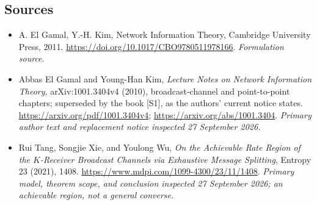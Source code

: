 \documentclass[11pt]{article}
\begin{document}
\subsection{Sources}
\begin{itemize}
\item[S1]A. El Gamal, Y.-H. Kim, Network Information Theory, Cambridge University Press, 2011.
\url{https://doi.org/10.1017/CBO9780511978166}.
\textit{Formulation source.}
\item[E1]Abbas El Gamal and Young-Han Kim,
\emph{Lecture Notes on Network Information Theory},
arXiv:1001.3404v4 (2010), broadcast-channel and point-to-point chapters;
superseded by the book [S1], as the authors' current notice states.
\url{https://arxiv.org/pdf/1001.3404v4};
\url{https://arxiv.org/abs/1001.3404}.
\textit{Primary author text and replacement notice inspected
27 September 2026.}
\item[E2]Rui Tang, Songjie Xie, and Youlong Wu,
\emph{On the Achievable Rate Region of the $K$-Receiver Broadcast Channels
via Exhaustive Message Splitting}, Entropy 23 (2021), 1408.
\url{https://www.mdpi.com/1099-4300/23/11/1408}.
\textit{Primary model, theorem scope, and conclusion inspected
27 September 2026; an achievable region, not a general converse.}

\end{itemize}
\end{document}
